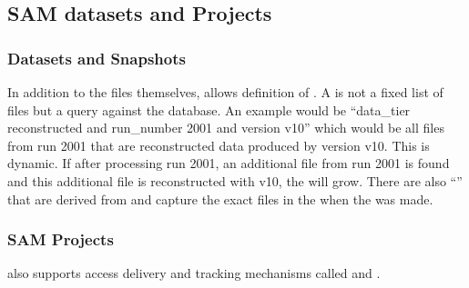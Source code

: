 \documentclass[../main-v1.tex]{subfiles}
\begin{document}
\subsection{SAM datasets and Projects}

\subsubsection{Datasets and Snapshots}

In addition to the files themselves,  allows %
definition of .
A   is not a fixed list of files but a query against the  database. An example would be ``data\_tier reconstructed and run\_number 2001 and version v10'' which would be all files from run 2001 that are reconstructed data produced by version v10. This  is dynamic. If after processing run 2001, an additional file from run 2001 is found
and this additional file is reconstructed with v10, the  will grow. There are also  ``'' that are derived from  and capture the exact files in the  when the  was made.





\subsubsection{SAM Projects}


 also supports access delivery and  tracking mechanisms called  and .
\end{document}
